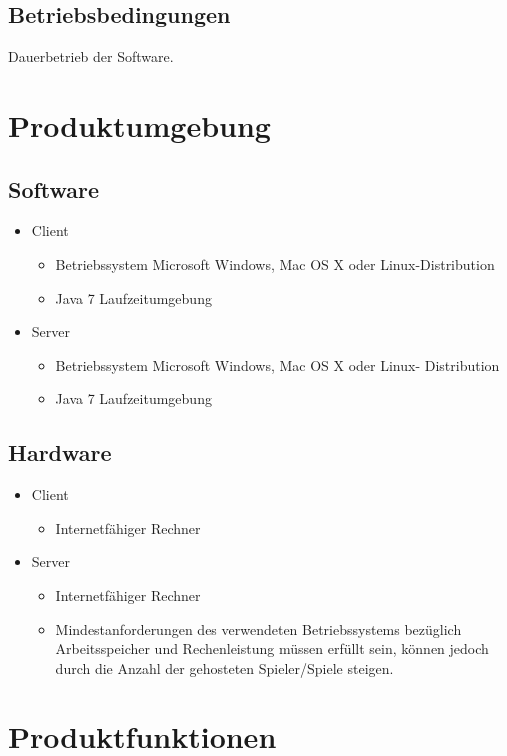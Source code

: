 \documentclass{article}
\begin{document}
\subsection{Betriebsbedingungen}
Dauerbetrieb der Software.

\section{Produktumgebung}
\subsection{Software}
	\begin{itemize}
		\item \gls{Client}
		\begin{itemize}
			\item Betriebssystem Microsoft Windows, Mac OS X oder Linux-Distribution 
			\item Java 7 Laufzeitumgebung
		\end{itemize}
		\item \gls{Server}
		\begin{itemize}
			\item Betriebssystem Microsoft Windows, Mac OS X oder Linux- Distribution 
			\item Java 7 Laufzeitumgebung
		\end{itemize}
	\end{itemize}

\subsection{Hardware}
\begin{itemize}
		\item \gls{Client}
		\begin{itemize}
			\item Internetfähiger Rechner
		\end{itemize}
		\item \gls{Server}
		\begin{itemize}
			\item Internetfähiger Rechner	
			\item Mindestanforderungen des verwendeten Betriebssystems bezüglich Arbeitsspeicher und Rechenleistung 					      müssen erfüllt sein, können jedoch durch die Anzahl der gehosteten Spieler/Spiele steigen.
		\end{itemize}
	\end{itemize}

\section{Produktfunktionen}
\end{document}
